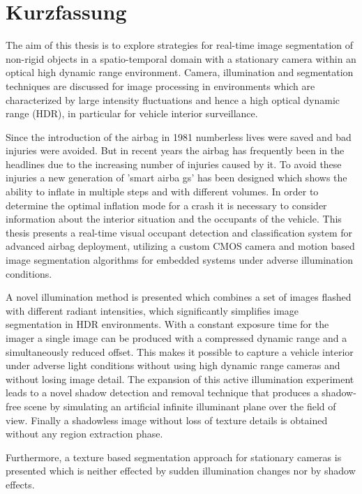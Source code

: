%
\chapter*{Kurzfassung}
%
\label{sec:Abstract}%
%
The aim of this thesis is to explore strategies for
real-time image segmentation of non-rigid objects in a
spatio-temporal domain with a stationary camera within an optical
high dynamic range environment. Camera, illumination and
segmentation techniques are discussed for image processing in
environments which are characterized by large intensity
fluctuations and hence a high optical dynamic range (HDR), in
particular for vehicle interior surveillance.

Since the introduction of the airbag in 1981 numberless lives were
saved and bad injuries were avoided. But in recent years the
airbag has frequently been in the headlines due to the increasing
number of injuries caused by it. %
To avoid these injuries a new generation of 'smart airba gs' has
been designed which shows the ability to inflate in multiple steps
and with different volumes. In order to determine the optimal
inflation mode for a crash it is necessary to consider information
about the interior situation and the occupants of the vehicle.
This thesis presents a real-time visual occupant detection and
classification system for advanced airbag deployment, utilizing a
custom CMOS camera and motion based image segmentation algorithms
for embedded systems under adverse illumination conditions.

A novel illumination method is presented which combines a set of
images flashed with different radiant intensities, which
significantly simplifies image segmentation in HDR environments.
With a constant exposure time for the imager a single image can be
produced with a compressed dynamic range and a simultaneously
reduced offset. This makes it possible to capture a vehicle
interior under adverse light conditions without using high dynamic
range cameras and without losing image detail. The expansion of
this active illumination experiment leads to a novel shadow
detection and removal technique that produces a shadow-free scene
by simulating an artificial infinite illuminant plane over the
field of view. Finally a shadowless image without loss of texture
details is obtained without any region extraction phase.


Furthermore, a texture based segmentation approach for stationary
cameras is presented which is neither effected by sudden
illumination changes nor by shadow effects. %
